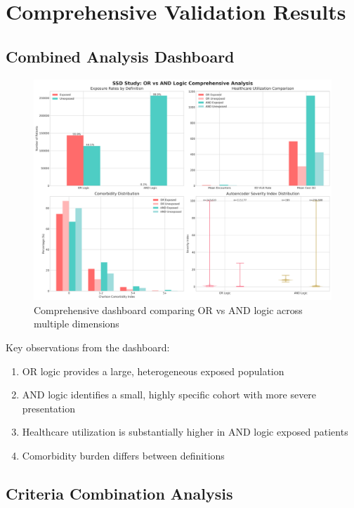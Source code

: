 \documentclass[11pt]{article}
\begin{document}
\section{Comprehensive Validation Results}

\subsection{Combined Analysis Dashboard}

\begin{figure}[H]
\centering
\includegraphics[width=\textwidth]{analysis/combined_validation_results/combined_analysis_dashboard.png}
\caption{Comprehensive dashboard comparing OR vs AND logic across multiple dimensions}
\label{fig:dashboard}
\end{figure}

Key observations from the dashboard:
\begin{enumerate}
    \item OR logic provides a large, heterogeneous exposed population
    \item AND logic identifies a small, highly specific cohort with more severe presentation
    \item Healthcare utilization is substantially higher in AND logic exposed patients
    \item Comorbidity burden differs between definitions
\end{enumerate}

\subsection{Criteria Combination Analysis}
\end{document}

